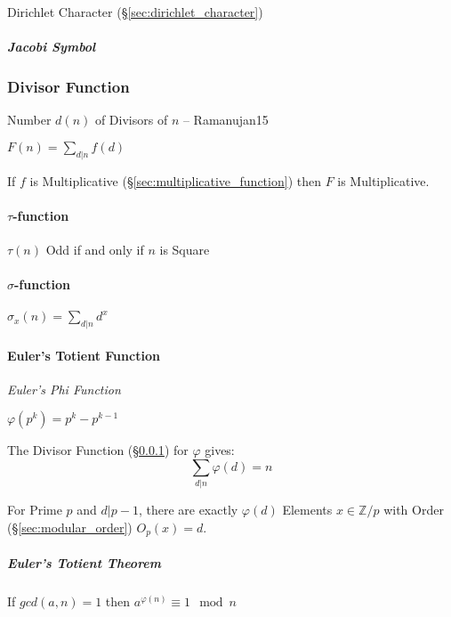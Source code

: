 Dirichlet Character (\S\ref{sec:dirichlet_character})



\subparagraph{Jacobi Symbol}\label{sec:jacobi_symbol}\hfill



\subsubsection{Divisor Function}\label{sec:divisor_function}

Number $d(n)$ of Divisors of $n$ -- Ramanujan15

$F(n) = \sum_{d|n}f(d)$

If $f$ is Multiplicative (\S\ref{sec:multiplicative_function}) then
$F$ is Multiplicative.



\paragraph{$\tau$-function}\label{sec:tau_function}\hfill

$\tau(n)$ Odd if and only if $n$ is Square



\paragraph{$\sigma$-function}\label{sec:sigma_function}\hfill

$\sigma_x(n) = \sum_{d | n} d^x$



\paragraph{Euler's Totient Function}\label{sec:eulers_totient}\hfill

\emph{Euler's Phi Function}

$\varphi(p^k) = p^k - p^{k-1}$

The Divisor Function (\S\ref{sec:divisor_function}) for $\varphi$
gives:
\[
  \sum_{d|n}\varphi(d) = n
\]

For Prime $p$ and $d|p-1$, there are exactly $\varphi(d)$ Elements $x
\in \mathbb{Z}/p$ with Order (\S\ref{sec:modular_order}) $O_p(x) = d$.

\subparagraph{Euler's Totient Theorem}\label{sec:totient_theorem}\hfill

If $gcd(a,n) = 1$ then $a^{\varphi(n)} \equiv 1 \mod n$



